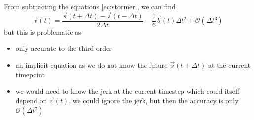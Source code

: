 From subtracting the equations \ref{eq:stormer}, we can find
\begin{equation}
  \vec{v}(t) = \frac{\vec{s}(t+\Delta t) - \vec{s}(t - \Delta t)}{2 \Delta t} - \frac{1}{6} \vec{b}(t) \Delta t^2 + \mathcal{O}(\Delta t^3)
\end{equation}
but this is problematic as
\begin{itemize}
  \item \textcolor{red1}{only accurate to the third order}
  \item \textcolor{red1}{an implicit equation as we do not know the future $\vec{s}(t+\Delta t)$ at the current timepoint}
  \item \textcolor{red1}{we would need to know the jerk at the current timestep which could itself depend on $\vec{v}(t)$}, \textcolor{green1}{we could
  ignore the jerk}, \textcolor{red1}{but then the accuracy is only $\mathcal{O}(\Delta t^2)$}
\end{itemize}

